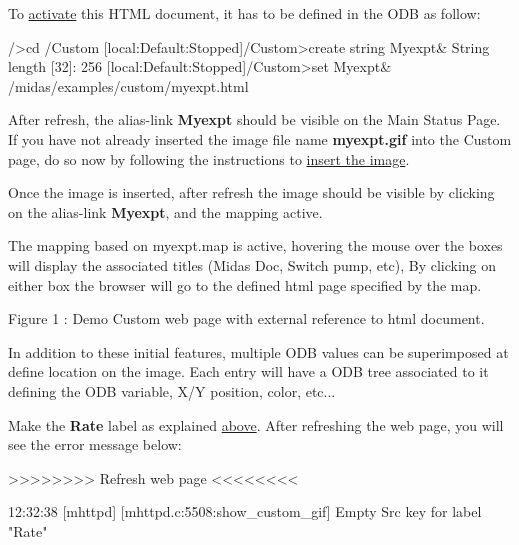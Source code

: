 To \hyperlink{RC_mhttpd_Activate}{activate} this HTML document, it has to be defined in the ODB as follow: 
\begin{DoxyCode}
/>cd /Custom
[local:Default:Stopped]/Custom>create string Myexpt&
String length [32]: 256
[local:Default:Stopped]/Custom>set Myexpt& /midas/examples/custom/myexpt.html
\end{DoxyCode}
 After refresh, the alias-\/link {\bfseries Myexpt} should be visible on the Main Status Page. If you have not already inserted the image file name {\bfseries myexpt.gif} into the Custom page, do so now by following the instructions to \hyperlink{RC_mhttpd_Image_access_RC_mhttpd_custom_image}{insert the image}.

Once the image is inserted, after refresh the image should be visible by clicking on the alias-\/link {\bfseries Myexpt}, and the mapping active.

\label{RC_mhttpd_custom_demo_mapping_demo}
\hypertarget{RC_mhttpd_custom_demo_mapping_demo}{}
 The mapping based on myexpt.map is active, hovering the mouse over the boxes will display the associated titles (Midas Doc, Switch pump, etc), By clicking on either box the browser will go to the defined html page specified by the map.

\par
\par
\par
 \begin{center}  Figure 1 : Demo Custom web page with external reference to html document. \par
\par
\par
  \end{center}  \par
\par
\par


In addition to these initial features, multiple ODB values can be superimposed at define location on the image. Each entry will have a ODB tree associated to it defining the ODB variable, X/Y position, color, etc...

Make the {\bfseries Rate} label as explained \hyperlink{RC_mhttpd_Image_access_RC_mhttpd_custom_labels}{above}. After refreshing the web page, you will see the error message below:


\begin{DoxyCode}
>>>>>>>> Refresh web page <<<<<<<<

12:32:38 [mhttpd] [mhttpd.c:5508:show_custom_gif] Empty Src key for label "Rate"
\end{DoxyCode}


